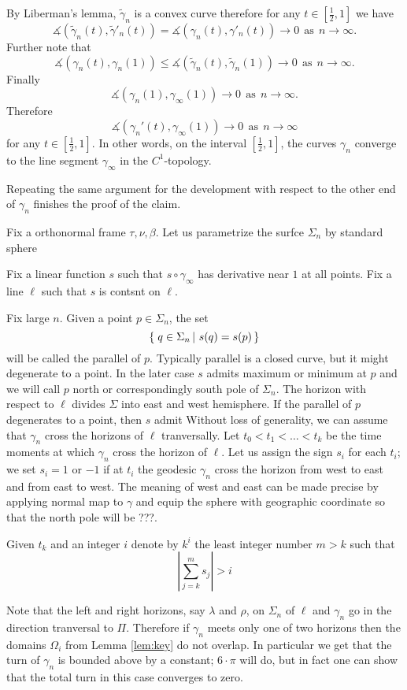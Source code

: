 \documentclass[a4paper,10pt]{amsart}
\begin{document}
By Liberman's lemma, $\tilde\gamma_n$ is a convex curve therefore for any $t\in[\tfrac12,1]$ we have
\[\measuredangle(\tilde\gamma_n(t),\tilde\gamma'_n(t))=\measuredangle(\gamma_n(t),\gamma'_n(t))\to0
\ \ \text{as}\ \ 
n\to \infty.\]
Further note that
\[
\measuredangle(\gamma_n(t),\gamma_n(1))
\le
\measuredangle(\tilde\gamma_n(t),\tilde\gamma_n(1))
\to 0 
\ \ \text{as}
\ \ 
n\to \infty.
\]
Finally
\[\measuredangle(\gamma_n(1),\gamma_\infty(1))\to 0\ \ \text{as}
\ \ 
n\to \infty.\]
Therefore 
\[\measuredangle(\gamma_n'(t),\gamma_\infty(1))\to 0\ \ \text{as}
\ \ 
n\to \infty\]
for any $t\in[\tfrac12,1]$.
In other words, on the interval $[\tfrac12,1]$, the curves $\gamma_n$ converge to the line segment $\gamma_\infty$ in the $C^1$-topology.

Repeating the same argument for the development with respect to the other end of $\gamma_n$ finishes the proof of the claim. 

\medskip

Fix a orthonormal frame $\tau,\nu,\beta$.
Let us parametrize the surfce $\Sigma_n$ by standard sphere


Fix a linear function $s$ such that $s\circ\gamma_\infty$ 
has derivative near $1$ at all points.
Fix a line $\ell$ such that $s$ is contsnt on $\ell$.

Fix large $n$.
Given a point $p\in \Sigma_n$,
the set 
\[\set{q\in\Sigma_n}{s(q)=s(p)}\]
will be called the parallel of $p$.
Typically parallel is a closed curve,
but it might degenerate to a point.
In the later case $s$ admits maximum or minimum at $p$
and we will call $p$ north or correspondingly south pole of $\Sigma_n$.
The horizon with respect to $\ell$ divides $\Sigma$ into east and west hemisphere.
If the parallel of $p$ degenerates to a point, 
then $s$ admit
Without loss of generality, we can assume that $\gamma_n$ 
cross the horizons of $\ell$ tranversally.
Let $t_0<t_1<\dots<t_k$ be the time moments 
at which $\gamma_n$ cross the horizon of $\ell$.
Let us assign the sign $s_i$ for each $t_i$;
we set $s_i=1$ or $-1$ 
if at $t_i$ the geodesic $\gamma_n$ cross the horizon from west to east and
from east to west.
The meaning of west and east can be made precise by applying normal map to $\gamma$ and equip the sphere with geographic coordinate so that the north pole will be ???. 

Given $t_k$ and an integer 
$i$ denote by $k^i$ the least integer number $m>k$ such that
\[|\sum_{j=k}^m s_j|>i\]




Note that the left and right horizons, 
say $\lambda$ and $\rho$,
on $\Sigma_n$ of $\ell$
and $\gamma_n$ go in the direction tranversal to $\Pi$.
Therefore if $\gamma_n$ meets only one of two horizons
then the domains $\Omega_i$ from Lemma \ref{lem:key}
do not overlap.
In particular we get that the turn of $\gamma_n$ is bounded above by a constant;
$6\cdot\pi$ will do, but in fact one can show that the total turn in this case converges to zero. 
\end{document}
